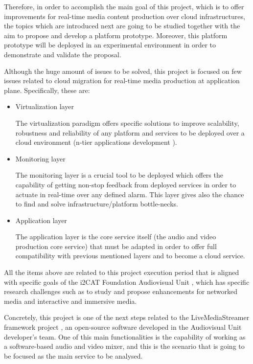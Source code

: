 Therefore, in order to accomplish the main goal of this project, which is to offer improvements for real-time media content production over cloud infrastructures, the topics which are introduced next are going to be studied together with the aim to propose and develop a platform prototype. Moreover, this platform prototype will be deployed in an experimental environment in order to demonstrate and validate the proposal.

Although the huge amount of issues to be solved, this project is focused on few issues related to cloud migration for real-time media production at application plane. Specifically, these are:

\begin{itemize}
\item Virtualization layer \hfill 

The virtualization paradigm offers specific solutions to improve scalability, robustness and reliability of any platform and services to be deployed over a cloud environment (n-tier applications development \cite{n-tier architecture}). 

\item Monitoring layer \hfill 

The monitoring layer is a crucial tool to be deployed which offers the capability of getting non-stop feedback from deployed services in order to actuate in real-time over any defined alarm. This layer gives also the chance to find and solve infrastructure/platform bottle-necks.

\item Application layer \hfill 

The application layer is the core service itself (the audio and video production core service) that must be adapted in order to offer full compatibility with previous mentioned layers and to become a cloud service.

\end{itemize}

All the items above are related to this project execution period that is aligned with specific goals of the i2CAT Foundation Audiovisual Unit \cite{i2catua}, which has specific research challenges such as to study and propose enhancements for networked media and interactive and immersive media. 

Concretely, this project is one of the next steps related to the LiveMediaStreamer framework project \cite{lmsGITHUB}, an open-source software developed in the Audiovisual Unit developer's team. One of this main functionalities is the capability of working as a software-based audio and video mixer, and this is the scenario that is going to be focused as the main service to be analysed.

